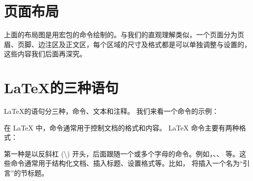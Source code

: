 \clearpage

\section{页面布局}
\drawpage
上面的布局图是用宏包的\texinline{\drawpage}命令绘制的。与我们的直观理解类似，一个页面分为页眉、页脚、边注区及正文区，每个区域的尺寸及格式都是可以单独调整与设置的，这些内容我们后面再深究。

\section{\LaTeX 的三种语句} \label{sec:text type}
\LaTeX 的语句分三种，命令、文本和注释。
我们来看一个命令的示例：
\begin{texlst}
\end{texlst}

在 \LaTeX{} 中，命令通常用于控制文档的格式和内容。 \LaTeX{} 命令主要有两种格式：

第一种是以反斜杠 (\textbackslash) 开头，后面跟随一个或多个字母的命令。例如，\texinline{\begin}、\texinline{\end}、\texinline{\section} 等。这些命令通常用于结构化文档、插入标题、设置格式等。比如， 将插入一个名为“引言”的节标题。

